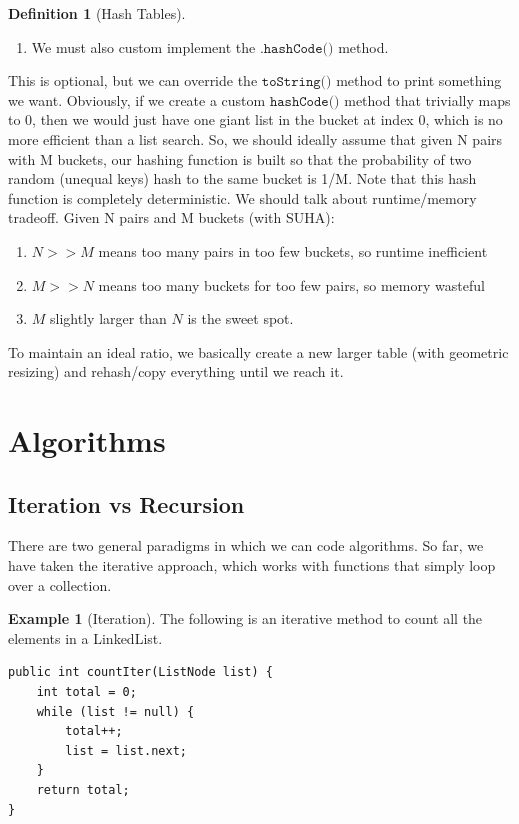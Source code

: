 \documentclass{article}
\theoremstyle{definition}
\newtheorem{example}{Example}[section]
\theoremstyle{remark}
\theoremstyle{definition}
\newtheorem{definition}{Definition}[section]
\begin{document}
\begin{definition}[Hash Tables]
\begin{enumerate}
    \item We must also custom implement the $\texttt{.hashCode()}$ method.
\end{enumerate}
This is optional, but we can override the $\texttt{toString()}$ method to print something we want. Obviously, if we create a custom $\texttt{hashCode()}$ method that trivially maps to 0, then we would just have one giant list in the bucket at index 0, which is no more efficient than a list search. So, we should ideally assume that given N pairs with M buckets, our hashing function is built so that the probability of two random (unequal keys) hash to the same bucket is 1/M. Note that this hash function is completely deterministic. We should talk about runtime/memory tradeoff. Given N pairs and M buckets (with SUHA): 
\begin{enumerate}
    \item $N >> M$ means too many pairs in too few buckets, so runtime inefficient 
    \item $M >> N$ means too many buckets for too few pairs, so memory wasteful 
    \item $M$ slightly larger than $N$ is the sweet spot.
\end{enumerate}
To maintain an ideal ratio, we basically create a new larger table (with geometric resizing) and rehash/copy everything until we reach it.
\end{definition}

\section{Algorithms}

\subsection{Iteration vs Recursion}

There are two general paradigms in which we can code algorithms. So far, we have taken the iterative approach, which works with functions that simply loop over a collection. 

\begin{example}[Iteration]
The following is an iterative method to count all the elements in a LinkedList. 
\begin{verbatim}
public int countIter(ListNode list) {
    int total = 0; 
    while (list != null) {
        total++; 
        list = list.next; 
    }
    return total; 
}
\end{verbatim}
\end{example}
\end{document}
